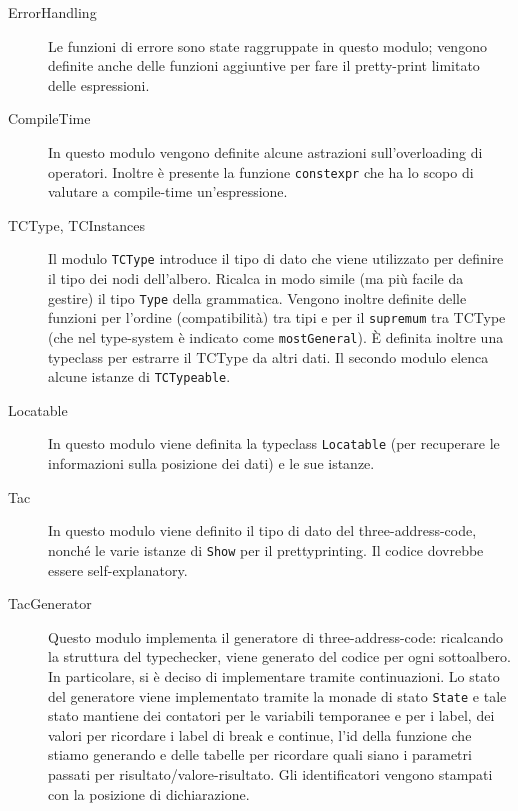 \documentclass{report}
\newcommand{\term}[1]{\texttt{#1}}
\begin{document}
\begin{description}
    \item[ErrorHandling] Le funzioni di errore sono state raggruppate in questo modulo; vengono definite anche delle funzioni aggiuntive
        per fare il pretty-print limitato delle espressioni.

    \item[CompileTime] In questo modulo vengono definite alcune astrazioni sull'overloading di operatori. Inoltre è presente
        la funzione \term{constexpr} che ha lo scopo di valutare a compile-time un'espressione.

    \item[TCType, TCInstances] Il modulo \term{TCType} introduce il tipo di dato che viene utilizzato per definire il tipo
        dei nodi dell'albero. Ricalca in modo simile (ma più facile da gestire) il tipo \term{Type} della grammatica.
        Vengono inoltre definite delle funzioni per l'ordine (compatibilità) tra tipi e per il \term{supremum} tra TCType 
        (che nel type-system è indicato come \term{mostGeneral}). È definita inoltre una typeclass per estrarre il TCType
        da altri dati. Il secondo modulo elenca alcune istanze di \term{TCTypeable}.

    \item[Locatable] In questo modulo viene definita la typeclass \term{Locatable} (per recuperare le informazioni
        sulla posizione dei dati) e le sue istanze.

    \item[Tac] In questo modulo viene definito il tipo di dato del three-address-code, nonché le varie istanze
        di \term{Show} per il prettyprinting. Il codice dovrebbe essere self-explanatory.

    \item[TacGenerator] Questo modulo implementa il generatore di three-address-code: ricalcando la struttura del typechecker,
        viene generato del codice per ogni sottoalbero. In particolare, si è deciso di implementare tramite continuazioni.
        Lo stato del generatore viene implementato tramite la monade di stato \term{State} e tale stato mantiene dei contatori
        per le variabili temporanee e per i label, dei valori per ricordare i label di break e continue, l'id della funzione
        che stiamo generando e delle tabelle per ricordare quali siano i parametri passati per risultato/valore-risultato.
        Gli identificatori vengono stampati con la posizione di dichiarazione.

\end{description}
\end{document}
